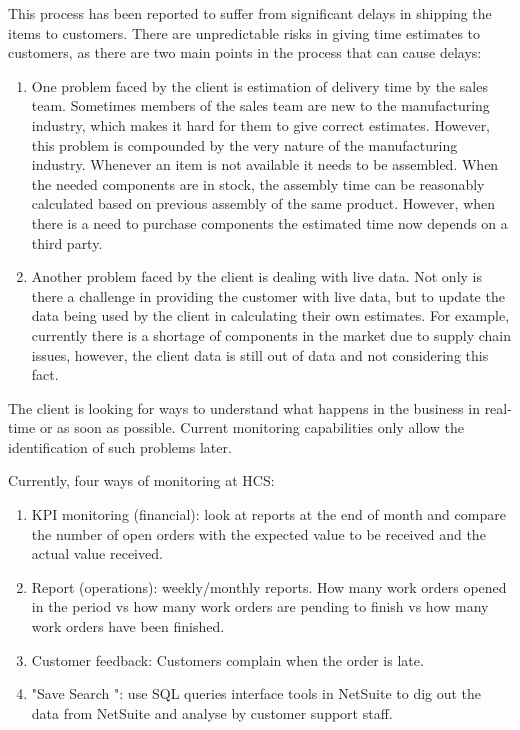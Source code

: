 This process has been reported to suffer from significant delays in shipping the items to customers. There are unpredictable risks in giving time estimates to customers, as there are two main points in the process that can cause delays:
\begin{enumerate}
    \item One problem faced by the client is estimation of delivery time by the sales team. Sometimes members of the sales team are new to the manufacturing industry, which makes it hard for them to give correct estimates. 
    However, this problem is compounded by the very nature of the manufacturing industry. Whenever an item is not available it needs to be assembled. 
    When the needed components are in stock, the assembly time can be reasonably calculated based on previous assembly of the same product. 
    However, when there is a need to purchase components the estimated time now depends on a third party. 
    
    \item Another problem faced by the client is dealing with live data. Not only is there a challenge in providing the customer with live data, but to update the data being used by the client in calculating their own estimates. For example, currently there is a shortage of components in the market due to supply chain issues, however, the client data is still out of data and not considering this fact.

\end{enumerate}

The client is looking for ways to understand what happens in the business in real-time or as soon as possible. Current monitoring capabilities only allow the identification of such problems later. 

Currently, four ways of monitoring at HCS:
\begin{enumerate}
    \item KPI monitoring (financial): look at reports at the end of month and compare the number of open orders with the expected value to be received and the actual value received.
    \item Report (operations): weekly/monthly reports. How many work orders opened in the period vs how many work orders are pending to finish vs how many work orders have been finished.
    \item Customer feedback: Customers complain when the order is late.
    \item "Save Search ": use SQL queries interface tools in NetSuite to dig out the data from NetSuite and analyse by customer support staff.
\end{enumerate}

